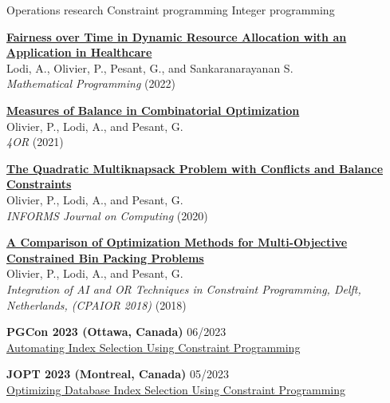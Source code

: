 \documentclass{memoir}
\begin{document}
\begin{list}{}

  
  \BulletItem Operations research
  \BulletItem Constraint programming
  \BulletItem Integer programming

  

  \Item \href{https://doi.org/10.1007/s10107-022-01904-6}{\textbf{Fairness over Time in Dynamic Resource Allocation with an Application in Healthcare}} \\
  Lodi, A., Olivier, P., Pesant, G., and Sankaranarayanan S. \\
  \emph{Mathematical Programming} (2022)

  \Item \href{https://doi.org/10.1007/s10288-021-00486-x}{\textbf{Measures of Balance in Combinatorial Optimization}} \\
  Olivier, P., Lodi, A., and Pesant, G. \\
  \emph{4OR} (2021)

  \Item \href{https://doi.org/10.1287/ijoc.2020.0983}{\textbf{The Quadratic Multiknapsack Problem with Conflicts and Balance Constraints}} \\
  Olivier, P., Lodi, A., and Pesant, G. \\
  \emph{INFORMS Journal on Computing} (2020)

  \Item \href{https://doi.org/10.1007/978-3-319-93031-2_33}{\textbf{A Comparison of Optimization Methods for Multi-Objective Constrained Bin Packing Problems}} \\
  Olivier, P., Lodi, A., and Pesant, G. \\
  \emph{Integration of AI and OR Techniques in Constraint Programming, Delft, Netherlands, (CPAIOR 2018)} (2018)


  \Item \textbf{PGCon 2023 (Ottawa, Canada)} \hfill 06/2023 \\
  \href{https://www.pgcon.org/events/pgcon_2023/schedule/session/422-automating-index-selection-using-constraint-programming/}{Automating Index Selection Using Constraint Programming}

  \Item \textbf{JOPT 2023 (Montreal, Canada)} \hfill 05/2023 \\
  \href{https://symposia.cirrelt.ca/CORS-JOPT/fr/schedule?slot_id=2207}{Optimizing Database Index Selection Using Constraint Programming}
  

\end{list}
\end{document}
